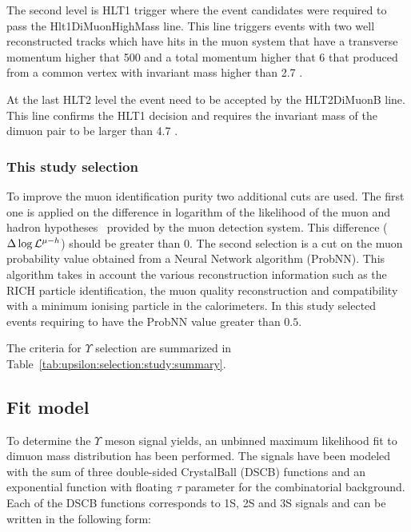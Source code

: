 The second level is HLT1 trigger where the event candidates were required to
pass the Hlt1DiMuonHighMass line.
This line triggers events with  two well reconstructed tracks  which have hits
in the muon system  that have a transverse momentum higher that 500 \mevc and 
a total momentum higher that 6 \gevc that produced from a common vertex with
invariant mass higher than 2.7 \gevcc.

At the last HLT2 level the event need to be accepted by the HLT2DiMuonB line.
This line confirms the HLT1 decision and requires the invariant mass of the
dimuon pair to be larger than 4.7 \gevcc.

\subsubsection{This study selection}
\label{sec:upsilon:selection:study}

To improve the muon identification purity two additional cuts are used. The
first one is applied on the difference in logarithm of the likelihood of the
muon and hadron hypotheses~\cite{Powell} provided by the muon detection system.
This difference ($\Delta\log\mathcal{L}^{\mu-h}$) should be greater than 0. The
second selection  is a cut on the muon probability value obtained from a Neural
Network algorithm (ProbNN). This algorithm takes in account the various
reconstruction information such as the RICH particle identification, the muon
quality reconstruction and compatibility with a minimum ionising particle in the
calorimeters. In this study selected events requiring to have the ProbNN value
greater than $0.5$.

The criteria for  $\Upsilon$ selection are summarized in
Table~\ref{tab:upsilon:selection:study:summary}.



\subsection{Fit model}
\label{sec:upsilon:fit}
To determine the $\Upsilon$ meson signal yields, an unbinned maximum likelihood
fit to dimuon mass distribution has been performed. The signals have been
modeled with the sum of three double-sided CrystalBall (DSCB) functions and an exponential
function with floating $\tau$ parameter for the combinatorial background. Each
of the DSCB functions corresponds to \Y1S, \Y2S and \Y3S signals and can
be written in the following form:

